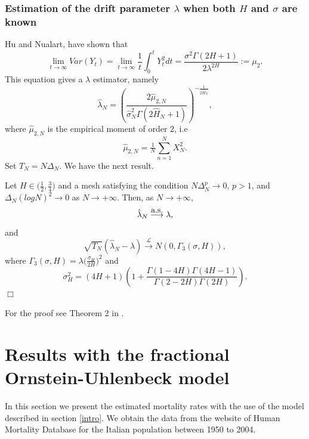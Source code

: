 \documentclass[smallextended]{svjour3}
\begin{document}
\subsubsection{Estimation of the drift parameter $\lambda$ when both $H$ and 
$\sigma$ are known}

Hu and Nualart, \cite{hu-nu} have shown that
\[
\lim_{t\rightarrow \infty} Var (Y_t)= \lim_{t\rightarrow \infty} 
\frac{1}{t}\int_0^t Y_t^2 dt = \frac{\sigma^2 \Gamma(2H+1) }
{2\lambda^{2H}}:=\mu_2.
\]
This equation gives a $\lambda$ estimator, namely
\begin{equation}
\hat{\lambda}_N = \left(\frac{2\hat{\mu}_{2,N}}{\hat{\sigma}_N^2 
\Gamma(2\hat{H}_N+1) }  \right)^{-\tfrac{1}{2\hat{H}_N}},\label{est3}
\end{equation}
where $\hat{\mu}_{2,N}$ is the empirical moment of order $2$, i.e
\[
\hat{\mu}_{2,N} =\tfrac{1}{N}\sum_{n=1}^N X_N^2.
\]
Set $T_N=N\Delta_N$. We have the next result.
\begin{theorem}
    Let $H \in \big(\tfrac{1}{2} , \tfrac{3}{4}\big)$ and a mesh satisfying the 
    condition $N \Delta_N^p\rightarrow 0$, $p>1$,
    and $ \Delta_N (log N )^2 \rightarrow 0$ as $N \rightarrow +\infty$. Then, 
    as $N \rightarrow +\infty$,
    \[
    \hat{\lambda}_N \stackrel{\hbox{\rm a.s.}}{\longrightarrow}  \lambda,
    \]
    and
    \[
    \sqrt{T_N} ( \hat{\lambda}_N -\lambda) 
    \stackrel{\mathcal{L}}{\longrightarrow} N (0, \Gamma_3 (\sigma,H)),
    \]
    where $\Gamma_3 (\sigma,H)=\lambda \big(\tfrac{\sigma_H}{2H} \big)^2$ and
    \[
    \sigma_H^2= (4H+1)\left(1+\frac{\Gamma(1-4H)\Gamma(4H-1) 
    }{\Gamma(2-2H)\Gamma(2H)} \right).
    \]
    \hfill$\Box$
\end{theorem}
For the proof see Theorem 2 in \cite{br-ia}.\\







\section{Results with the fractional Ornstein-Uhlenbeck model}
\label{re-fou}

In this section we present the estimated mortality rates with the use of the 
model
described in section \ref{intro}. We obtain the data from the website of Human 
Mortality Database for the Italian population between 1950 to 2004.\\
\end{document}
